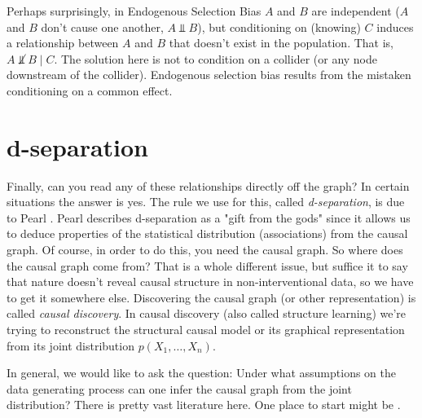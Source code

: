 \documentclass[11pt, oneside]{article}   	%
\begin{document}
\bigskip
\noindent
Perhaps surprisingly, in Endogenous Selection Bias $A$ and $B$ are independent ($A$ and $B$ don't cause one another, $A \Vbar B$), but conditioning on (knowing) $C$ induces a 
relationship between $A$ and $B$ that doesn't exist in the population. That is, $A \not \Vbar B \mid C$. The solution here is not to condition on a 
collider (or any node downstream of the collider). Endogenous selection bias results from the mistaken conditioning on a common effect.

\section{d-separation}
Finally, can you read any of these relationships directly off the graph? In certain situations the answer is yes. The rule we use for this, called \emph{d-separation}, is due
to Pearl \cite{Pearl:1988:PRI:52121}. Pearl describes d-separation as a "gift from the gods" since it allows us to deduce properties of the statistical distribution (associations) 
from the causal  graph. Of course, in order to do this, you need the causal graph. So where does the causal graph come from? That is a whole different issue, but suffice it to 
say that nature doesn't reveal causal structure in non-interventional data, so we have to get it somewhere else. Discovering the causal graph (or other representation) is called 
\emph{causal discovery}.  In causal discovery (also called structure learning) we're trying to reconstruct the structural causal model or its graphical representation from its joint 
distribution $p(X_1, \hdots, X_n)$.

\bigskip
\noindent
In general, we would like to ask the question:  Under what 
assumptions on the data generating process can one infer the causal graph from the joint distribution? There is pretty vast literature here. One place to start might be 
\cite{Peters:2011:ICG:3020548.3020617}. 





\end{document}
